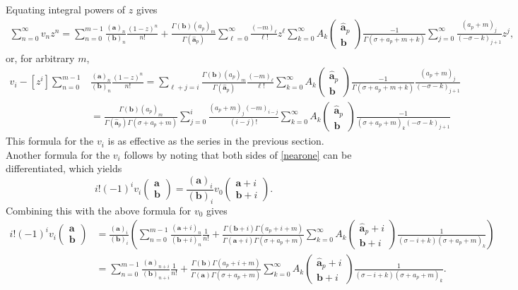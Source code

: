\documentclass[12pt]{article}
\numberwithin{equation}{section}
\newcommand{\ARG}[2] {\left( \begin{array}{c} #1 \\ #2 \end{array} \right)}
\begin{document}
Equating integral powers of $z$ gives 
\begin{align*}
\sum_{n=0}^\infty v_nz^n=\sum_{n=0}^{m-1}{\frac{(\mathbf{a})_n}{(\mathbf{b})_n} \frac{(1-z)^n}{n!}}+\frac{\Gamma(\mathbf{b})(a_p)_m}{\Gamma(\hat{\mathbf{a}}_p)} \sum_{\ell=0}^\infty\frac{(-m)_\ell}{\ell!}z^\ell \sum_{k=0}^{\infty} {A_k\left(\begin{array}{c} \hat{\mathbf{a}}_p \\ \mathbf{b} \end{array}\right)} \frac{-1}{\Gamma
	\left(\sigma+a_p+m+k\right)} \sum_{j=0}^{\infty} \frac{(a_p+m)_j}{(-\sigma-k)_{j+1}} z^j\text{,}
\end{align*}
or, for arbitrary $m$,
\begin{align*}
v_i - [z^i] \sum_{n=0}^{m-1}&{\frac{(\mathbf{a})_n}{(\mathbf{b})_n} \frac{(1-z)^n}{n!}} = \sum_{\ell +j=i}\frac{\Gamma(\mathbf{b})(a_p)_m}{\Gamma(\hat{\mathbf{a}}_p)}\frac{(-m)_\ell}{\ell!}\sum_{k=0}^{\infty} {A_k\left(\begin{array}{c} \hat{\mathbf{a}}_p \\ \mathbf{b} \end{array}\right)} \frac{-1}{\Gamma
	\left(\sigma+a_p+m+k\right)}\frac{(a_p+m)_j}{(-\sigma-k)_{j+1}}\\
&= \frac{\Gamma(\mathbf{b}) (a_p)_m}{\Gamma(\hat{\mathbf{a}}_p) \Gamma\left(\sigma+a_p+m\right)} \sum_{j=0}^{i}\frac{(a_p+m)_j (-m)_{i-j}}{(i-j)!}\sum_{k=0}^{\infty} {A_k\left(\begin{array}{c} \hat{\mathbf{a}}_p \\ \mathbf{b} \end{array}\right)} \frac{-1}{\left(\sigma+a_p+m\right)_k (-\sigma-k)_{j+1}}
\end{align*}
This formula for the $v_i$ is as effective as the series in the previous section. Another formula for the $v_i$ follows by noting that both sides of \eqref{nearone} can be differentiated, which yields
\begin{equation*}
i! (-1)^i v_i \ARG{\mathbf{a}}{\mathbf{b}} = \frac{(\mathbf{a})_i}{(\mathbf{b})_i} v_0 \ARG{\mathbf{a}+i}{\mathbf{b}+i}\text{.}
\end{equation*}
Combining this with the above formula for $v_0$ gives
\begin{align*}
i! (-1)^i v_i \ARG{\mathbf{a}}{\mathbf{b}} &= \frac{(\mathbf{a})_i}{(\mathbf{b})_i} \left(  \sum_{n=0}^{m-1}{\frac{(\mathbf{a}+i)_n}{(\mathbf{b}+i)_n} \frac{1}{n!}} +\frac{\Gamma(\mathbf{b}+i) \Gamma(a_p+i+m)}{\Gamma(\mathbf{a}+i) \Gamma(\sigma+a_p+m)} \sum_{k=0}^{\infty} A_k \ARG{\hat{\mathbf{a}}_p+i}{\mathbf{b}+i} \frac{1}{(\sigma-i+k) (\sigma+a_p+m)_k} \right)\\
&=\sum_{n=0}^{m-1}{\frac{(\mathbf{a})_{n+i}}{(\mathbf{b})_{n+i}} \frac{1}{n!}} + \frac{\Gamma(\mathbf{b}) \Gamma(a_p+i+m)}{\Gamma(\mathbf{a}) \Gamma(\sigma+a_p+m)} \sum_{k=0}^{\infty} A_k \ARG{\hat{\mathbf{a}}_p+i}{\mathbf{b}+i} \frac{1}{(\sigma-i+k) (\sigma+a_p+m)_k}\text{.}
\end{align*}
\end{document}
